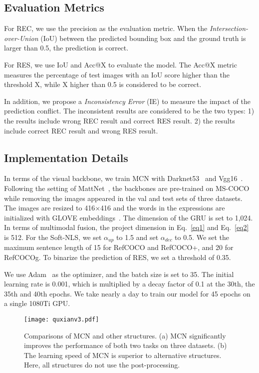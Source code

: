 \documentclass[10pt,twocolumn,letterpaper]{article}
\begin{document}
\subsection{Evaluation Metrics}

For REC, we use the precision as the evaluation metric. When the \emph{Intersection-over-Union} (IoU) between the predicted bounding box and the ground truth is larger than 0.5, the prediction is correct. 

For RES, we use IoU and Acc@X to evaluate the model. The Acc@X metric measures the percentage of test images with an IoU score higher than the threshold X, while X higher than 0.5 is considered to be correct. 

In addition, we propose a \emph{Inconsistency Error} (IE) to measure the impact of the prediction conflict. The inconsistent results are considered to be the two types: 1) the results include wrong
REC result and correct RES result. 2) the results include
correct REC result and wrong RES result.


\subsection{Implementation Details}
In terms of the visual backbone, we train MCN with Darknet53~\cite{redmon2018yolov3:} and Vgg16~\cite{simonyan2014very}.
Following the setting of MattNet~\cite{MATT:}, the backbones are pre-trained on MS-COCO~\cite{MSCOCO} while removing the images appeared in the val and test sets of three datasets. 
The images are resized to 416$\times$416 and the words in the expressions are initialized with GLOVE embeddings~\cite{pennington2014glove}. The dimension
of the GRU is set to 1,024. In terms of multimodal fusion, the project dimension  in Eq.~\ref{eq1} and Eq.~\ref{eq2} is 512. For the Soft-NLS,  we set $\alpha_{up}$ to 1.5 and set $\alpha_{dec}$ to 0.5.   We set the maximum sentence length of 15 for RefCOCO and RefCOCO+, and 20 for RefCOCOg. To binarize the prediction of RES, we set a threshold of 0.35. 

We use Adam~\cite{kingma2014adam} as the optimizer, and the batch size is set to 35. The initial learning rate is 0.001, which is multiplied by a decay factor of 0.1 at the 30th,  the 35th and 40th epochs. We take nearly a day to train our model for 45 epochs  on a single 1080Ti GPU. 
\begin{figure}[t]
	\centering
	\texttt{[image: quxianv3.pdf]}
\caption{Comparisons of MCN and other  structures. (a) MCN significantly improves the performance of both two tasks on three datasets.
		(b) The learning speed of MCN is  superior to alternative structures.
		Here, all structures do not use the post-processing.}
	\label{quxian} 
	\vspace{-1em}
\end{figure}
\end{document}
